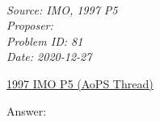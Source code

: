 \SSbreak\\       
\emph{Source: IMO, 1997 P5}\\
\emph{Proposer: \Pss}\\
\emph{Problem ID: 81}\\
\emph{Date: 2020-12-27}\\
\SSbreak


\bigskip

\begin{solution}\hfil\medskip

    \href{https://artofproblemsolving.com/community/c6h1238p3845}{1997 IMO P5 (AoPS Thread)}\medskip
    
    Answer: 
\end{solution}
